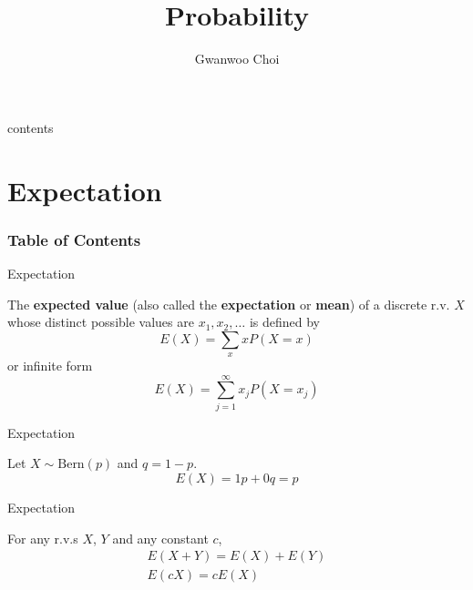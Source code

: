 \documentclass[8pt]{beamer}
\title{Probability}
\author{Gwanwoo Choi}
\newcommand{\tb}[1]{\textbf{#1}}
\begin{document}
\begin{frame}
    \titlepage
\end{frame}

\begin{frame}{contents}
    \tableofcontents
\end{frame}

\section{Expectation}

\begin{frame}
    \frametitle{Table of Contents}
    \tableofcontents[currentsection]
\end{frame}


\begin{frame}{Expectation}
    \begin{definition}
        The \tb{expected value} (also called the \tb{expectation} or \tb{mean}) of a discrete r.v. $X$ whose distinct possible values are $x_1, x_2, \dots$ is defined by 
        \[
            E(X) = \sum_x x P(X=x)
        \]
        or infinite form
        \[
            E(X) = \sum^\infty_{j=1} x_j P(X=x_j)
        \]

    \end{definition}
\end{frame}

\begin{frame}{Expectation}
    \begin{example}
        Let $X \sim \text{Bern}(p)$ and $q = 1-p$.
        \[
            E(X) = 1p +0q = p
        \]
    \end{example}
\end{frame}

\begin{frame}{Expectation}
    \begin{theorem}
        For any r.v.s $X$, $Y$ and any constant $c$, 
        \[
        \begin{gathered}
            E(X+Y)=E(X) + E(Y)\\
            E(cX) = cE(X)
        \end{gathered}
        \]
    \end{theorem}
\end{frame}
\end{document}
